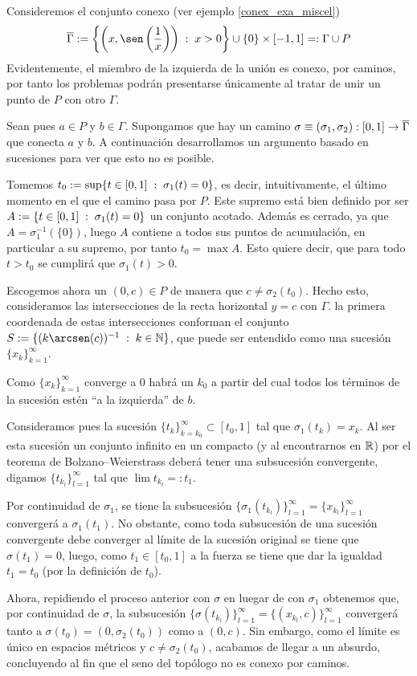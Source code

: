 \begin{exa}
	Consideremos el conjunto conexo (ver ejemplo \ref{conex_exa_miscel}) \[\adher{\Gamma}:=\left\{\left(x,\sen\left(\frac{1}{x}\right)\right)\midc x>0\right\}\cup\{0\}\times[-1,1]=:\Gamma\cup P\]
	Evidentemente, el miembro de la izquierda de la unión es conexo, por caminos, por tanto los problemas podrán presentarse únicamente al tratar de unir un punto de $P$ con otro $\Gamma$.
	
	Sean pues $a\in P$ y $b\in \Gamma$. Supongamos que hay un camino $\sigma\equiv(\sigma_1,\sigma_2):[0,1]\to\overline{\Gamma}$ que conecta $a$ y $b$. A continuación desarrollamos un argumento basado en sucesiones para ver que esto no es posible.
	
	Tomemos $t_0:=\sup\{t\in[0,1]\;:\; \sigma_1(t)=0\}$, es decir, intuitivamente, el último momento en el que el camino pasa por $P$. Este supremo está bien definido por ser $A:=\{t\in[0,1]\;:\; \sigma_1(t)=0\}$ un conjunto acotado. Además es cerrado, ya que $A=\sigma_1^{-1}(\{0\})$, luego $A$ contiene a todos sus puntos de acumulación, en particular a su supremo, por tanto $t_0=\max A$. Esto quiere decir, que para todo $t>t_0$ se cumplirá que $\sigma_1(t)>0$.
	
	Escogemos ahora un $(0,c)\in P$ de manera que $c\not=\sigma_2(t_0)$. Hecho esto, consideramos las intersecciones de la recta horizontal $y=c$ con $\Gamma$. la primera coordenada de estas intersecciones conforman el conjunto $S:=\{(k\arcsen(c))^{-1}\midc k\in\N\}$, que puede ser entendido como una sucesión $\{x_k\}_{k=1}^\infty$.
	
	Como $\{x_k\}_{k=1}^\infty$ converge a $0$ habrá un $k_0$ a partir del cual todos los términos de la sucesión estén ``a la izquierda'' de $b$.
	
	Consideramos pues la sucesión $\{t_k\}_{k=k_0}^\infty\subset[t_0,1]$ tal que $\sigma_1(t_k)=x_k$. Al ser esta sucesión un conjunto infinito en un compacto (y al encontrarnos en $\mathbb{R}$) por el teorema de Bolzano--Weierstrass deberá tener una subsucesión convergente, digamos $\{t_{k_l}\}_{l=1}^\infty$ tal que $\lim t_{k_l}=:t_1$.
	
	Por continuidad de $\sigma_1$, se tiene la subsucesión $\{\sigma_1(t_{k_l})\}_{l=1}^\infty=\{x_{k_l}\}_{l=1}^\infty$ convergerá a $\sigma_1(t_1)$. No obstante, como toda subsucesión de una sucesión convergente debe converger al límite de la sucesión original se tiene que $\sigma(t_1)=0$, luego, como $t_1\in[t_0,1]$ a la fuerza se tiene que dar la igualdad $t_1 = t_0$ (por la definición de $t_0$).
	
	Ahora, repidiendo el proceso anterior con $\sigma$ en luegar de con $\sigma_1$ obtenemos que, por continuidad de $\sigma$, la subsucesión $\{\sigma(t_{k_l})\}_{l=1}^\infty=\{(x_{k_l},c)\}_{l=1}^\infty$ convergerá tanto a $\sigma(t_0)=(0,\sigma_2(t_0))$ como a $(0,c)$. Sin embargo, como el límite es único en espacios métricos y $c\not=\sigma_2(t_0)$, acabamos de llegar a un absurdo, concluyendo al fin que el seno del topólogo no es conexo por caminos.
\end{exa}
